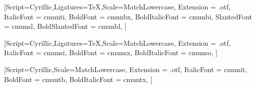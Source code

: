 
\newfontfamily{}%
[Script=Cyrillic,Ligatures=TeX,Scale=MatchLowercase,%
Extension = .otf,%
ItalicFont = cmunti,%
BoldFont = cmunbx,%
BoldItalicFont = cmunbi,%
SlantedFont = cmunsl,%
BoldSlantedFont = cmunbl,%
]

\newfontfamily{}%
[Script=Cyrillic,Ligatures=TeX,Scale=MatchLowercase,%
Extension = .otf,%
ItalicFont = cmunsi,%
BoldFont = cmunsx,%
BoldItalicFont = cmunso,%
]

\newfontfamily{}%
[Script=Cyrillic,Scale=MatchLowercase,%
Extension = .otf,%
ItalicFont = cmunit,%
BoldFont = cmuntb,%
BoldItalicFont = cmuntx,%
]

\setmainfont[Ligatures=TeX,Scale=MatchLowercase]{CMU Serif}
\setsansfont[Ligatures=TeX,Scale=MatchLowercase]{CMU Sans Serif}
\setmonofont[Scale=MatchLowercase]{CMU Typewriter Text}

